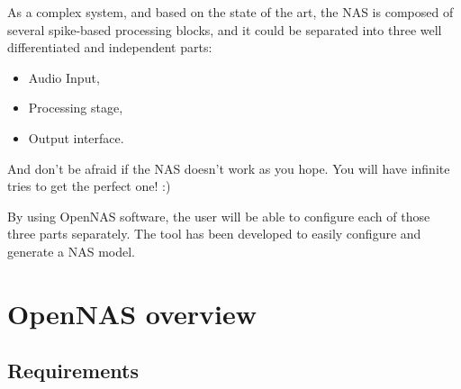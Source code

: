 
As a complex system, and based on the state of the art, the NAS is composed of several spike-based processing blocks, and it could be separated into three well differentiated and independent parts:
\begin{itemize}
\item Audio Input,
\item Processing stage,
\item Output interface.
\end{itemize}


And don't be afraid if the NAS doesn't work as you hope. You will have infinite tries to get the perfect one! :)


By using OpenNAS software, the user will be able to configure each of those three parts separately. The tool has been developed to easily configure and generate a NAS model. 


\section{OpenNAS overview}
\label{sec:Overview}

\subsection{Requirements}

